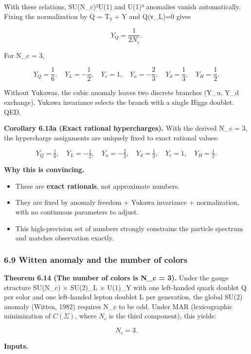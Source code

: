 With these relations, SU(N\_c)²U(1) and U(1)³ anomalies vanish automatically. Fixing the normalization by Q = T₃ + Y and Q(ν\_L)=0 gives

\[
Y_Q = \frac{1}{2 N_c}.
\]

For N\_c = 3,

\[
Y_Q = \frac{1}{6},\quad Y_L = -\frac{1}{2},\quad Y_e = 1,\quad
Y_u = -\frac{2}{3},\quad Y_d = \frac{1}{3},\quad Y_H = \frac{1}{2}.
\]

Without Yukawas, the cubic anomaly leaves two discrete branches (Y\_u, Y\_d exchange). Yukawa invariance selects the branch with a single Higgs doublet. QED.

\textbf{Corollary 6.13a (Exact rational hypercharges).} With the derived N\_c = 3, the hypercharge assignments are uniquely fixed to exact rational values:

\[
Y_Q = \tfrac{1}{6}, \quad
Y_L = -\tfrac{1}{2}, \quad
Y_u = -\tfrac{2}{3}, \quad
Y_d = \tfrac{1}{3}, \quad
Y_e = 1, \quad
Y_H = \tfrac{1}{2}.
\]

\textbf{Why this is convincing.}

\begin{itemize}
\tightlist
\item
  These are \textbf{exact rationals}, not approximate numbers.
\item
  They are fixed by anomaly freedom + Yukawa invariance + normalization, with no continuous parameters to adjust.
\item
  This high-precision set of numbers strongly constrains the particle spectrum and matches observation exactly.
\end{itemize}

\subsubsection{6.9 Witten anomaly and the number of colors}\label{69-witten-anomaly-and-the-number-of-colors}

\textbf{Theorem 6.14 (The number of colors is N\_c = 3).} Under the gauge structure SU(N\_c) × SU(2)\_L × U(1)\_Y with one left-handed quark doublet Q per color and one left-handed lepton doublet L per generation, the global SU(2) anomaly (Witten, 1982) requires N\_c to be odd. Under MAR (lexicographic minimization of \(C(\Sigma)\), where \(N_c\) is the third component), this yields:

\[
N_c = 3.
\]

\textbf{Inputs.}

